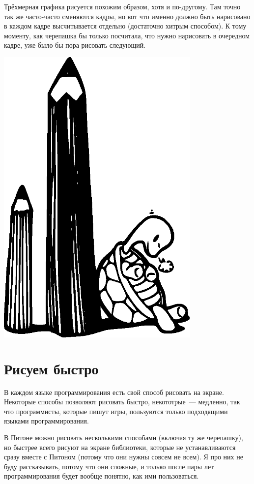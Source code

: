 Трёхмерная графика рисуется похожим образом, хотя и по-другому. Там точно так же часто-часто сменяются кадры, но вот что именно должно быть нарисовано в каждом кадре высчитывается отдельно (достаточно хитрым способом). К тому моменту, как черепашка бы только посчитала, что нужно нарисовать в очередном кадре, уже было бы пора рисовать следующий.

\begin{center}
\includegraphics*[width=100mm]{../en/turtle1.eps}
\end{center}

\section{Рисуем быстро}

В каждом языке программирования есть свой способ рисовать на экране. Некоторые способы позволяют рисовать быстро, некототрые — медленно, так что программисты, которые пишут игры, пользуются только подходящими языками программирования.

В Питоне можно рисовать несколькими способами (включая ту же черепашку), но быстрее всего рисуют на экране библиотеки, которые не устанавливаются сразу вместе с Питоном (потому что они нужны совсем не всем). Я про них не буду рассказывать, потому что они сложные, и только после пары лет программирования будет вообще понятно, как ими пользоваться.


